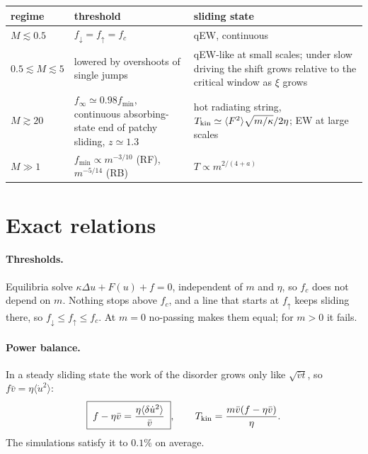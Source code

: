\documentclass[10pt,a4paper]{article}
\newcommand{\fd}{f_\downarrow}
\newcommand{\fu}{f_\uparrow}
\newcommand{\fcs}{f_c}
\begin{document}
\begin{center}\small
\begin{tabular}{p{2.3cm}p{6.2cm}p{6.6cm}}
\toprule
regime & threshold & sliding state \\
\midrule
$M\lesssim0.5$ & $\fd=\fu=\fcs$ & qEW, continuous \\
$0.5\lesssim M\lesssim5$ & lowered by overshoots of single jumps & qEW-like at small scales; under slow driving the shift grows relative to the critical window as $\xi$ grows \\
$M\gtrsim20$ & $f_\infty\simeq0.98f_{\min}$, continuous absorbing-state end of patchy sliding, $z\simeq1.3$ & hot radiating string, $T_{\rm kin}\simeq\langle F^2\rangle\sqrt{m/\kappa}/2\eta$; EW at large scales \\
$M\gg1$ & $f_{\min}\propto m^{-3/10}$ (RF), $m^{-5/14}$ (RB) & $T\propto m^{2/(4+a)}$ \\
\bottomrule
\end{tabular}
\end{center}

\section{Exact relations}
\label{sec:exact}

\paragraph{Thresholds.} Equilibria solve $\kappa\Delta u+F(u)+f=0$, independent of $m$ and $\eta$, so $\fcs$ does not depend on $m$. Nothing stops above $\fcs$, and a line that starts at $\fu$ keeps sliding there, so $\fd\le\fu\le\fcs$. At $m=0$ no-passing makes them equal; for $m>0$ it fails.

\paragraph{Power balance.} In a steady sliding state the work of the disorder grows only like $\sqrt{\bar vt}$, so $f\bar v=\eta\langle\dot u^2\rangle$:
\begin{equation}
\boxed{\;f-\eta\bar v=\frac{\eta\langle\delta\dot u^2\rangle}{\bar v}\;},\qquad T_{\rm kin}=\frac{m\bar v(f-\eta\bar v)}{\eta}.
\label{eq:identity}
\end{equation}
The simulations satisfy it to $0.1\%$ on average.
\end{document}
